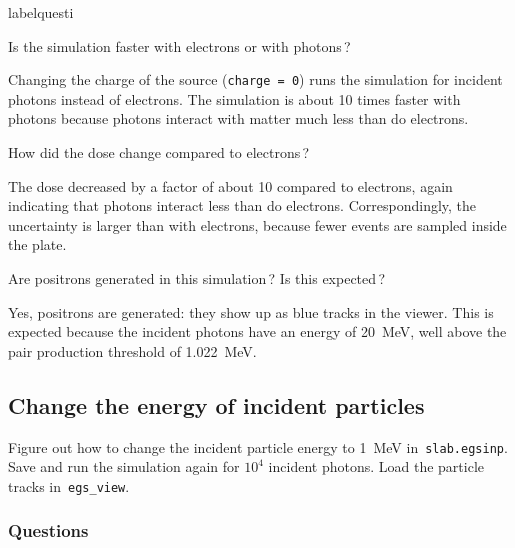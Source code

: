 \documentclass[12pt,twoside]{article}
\makeatletter
\renewcommand\thequesti         {\@arabic\c@questi}
\newenvironment{question}{
    \bfseries
    \edef\@questictr{questi}
    \expandafter
    \list \csname label\@questictr\endcsname {
        \usecounter\@questictr\def\makelabel##1{\hss\llap{##1}}
        \savebox{\questbox}             {\thequesti}
        \setlength\labelsep             {0.6em}
        \setlength\labelwidth           {\wd\questbox}
        \setlength\leftmargini          {\labelwidth}
        \addtolength{\leftmargini}      {\labelsep}
        \addtolength{\leftmargini}      {0.2em}
        \leftmargin\leftmargini
        \setlength\topsep               {1em}
        \setlength\itemsep              {1.2em}
        \setlength\parsep               {0.5em}
    }
}{\normalfont\endlist}
\newenvironment{answer}{\normalfont}{\relax}
\makeatother
\begin{document}
\begin{question}

\item Is the simulation faster with electrons or with photons\,?

\begin{answer}
Changing the charge of the source (\Verb|charge = 0|) runs the
simulation for incident photons instead of electrons. The simulation is
about 10 times faster with photons because photons interact with matter
much less than do electrons.
\end{answer}

\item How did the dose change compared to electrons\,?

\begin{answer}
The dose decreased by a factor of about 10 compared to electrons, again
indicating that photons interact less than do electrons.
Correspondingly, the uncertainty is larger than with electrons, because
fewer events are sampled inside the plate.
\end{answer}

\item Are positrons generated in this simulation\,? Is this expected\,?

\begin{answer}
Yes, positrons are generated: they show up as blue tracks in the
viewer. This is expected because the incident photons have an energy
of 20~MeV, well above the pair production threshold of 1.022~MeV.
\end{answer}

\end{question}



\subsection{Change the energy of incident particles}

Figure out how to change the incident particle energy to 1~MeV in
\,\Verb|slab.egsinp|. Save and run the simulation again for $10^4$
incident photons. Load the particle tracks in \,\Verb|egs_view|.

\subsubsection{Questions}
\end{document}

